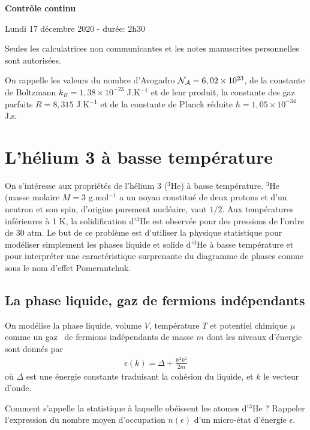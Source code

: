 \documentclass[utf8, 11pt]{feuille}
\begin{document}
\begin{center}
    \Large {\bf Contrôle continu}
    
    Lundi 17 décembre 2020 - durée: 2h30
\end{center}

Seules les calculatrices non communicantes et les notes manuscrites personnelles sont autorisées.

On rappelle les valeurs du nombre d'Avogadro ${\cal N_A}=6,02 \times 10^{23}$, de la constante de Boltzmann $k_B=1,38 \times 10^{-23}$ J.K$^{-1}$ et de leur produit, la constante des gaz parfaits $R=8,315$ J.K$^{-1}$ et de la constante de Planck réduite $\hbar = 1,05 \times 10^{-34}$ J.s.


\section{L'hélium 3 à basse température}

On s'intéresse aux propriétés de l'hélium 3 ($^3$He) à basse température. $^3$He (masse molaire $M=3$ g.mol$^{-1}$ a un noyau
constitué de deux protons et d'un neutron et son spin, d'origine purement nucléaire, vaut $1/2$. Aux températures inférieures à 1 K, la solidification d'$^3$He est observée pour des pressions de l'ordre de 30 atm. Le but de ce problème est d'utiliser la physique statistique pour modéliser simplement les phases liquide et solide d'$^3$He à basse température et pour
interpréter une caractéristique surprenante du diagramme de phases connue sous le nom d'effet Pomerantchuk.

\subsection*{La phase liquide, gaz de fermions indépendants}

On modélise la phase liquide, volume $V$, température $T$ et potentiel chimique $\mu$ comme un \og gaz \fg \ de fermions indépendants de masse $m$ dont les niveaux
d'énergie  sont donnés par
\begin{align*}
\epsilon (k)=\Delta+\frac{\hbar^2 k^2}{2m}
\end{align*}
où $\Delta$ est une énergie constante traduisant la cohésion du liquide, et $k$ le vecteur d'onde.

\question
Comment s'appelle la statistique à laquelle obéissent les atomes d'$^3$He ? Rappeler l'expression du nombre moyen d'occupation $n(\epsilon)$ d'un micro-état d'énergie $\epsilon$.
\end{document}

